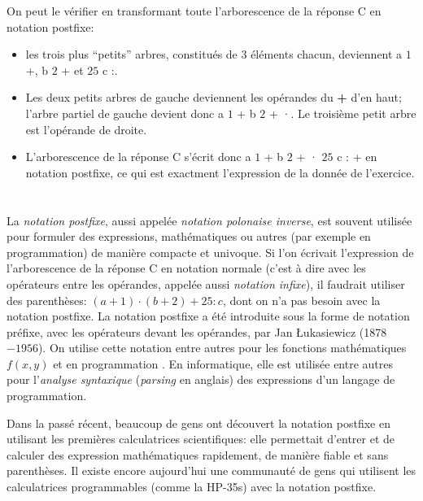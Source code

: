 {{On peut le vérifier en transformant toute l’arborescence de la réponse C en notation postfixe:

\begin{itemize}
  \item les trois plus “petits” arbres, constitués de $3$ éléments chacun, deviennent a $1$ +, b $2$ + et $25$ c :.
  \item Les deux petits arbres de gauche deviennent les opérandes du \textbf{+} d’en haut; l’arbre partiel de gauche devient donc a $1$ + b $2$ + ·. Le troisième petit arbre est l’opérande de droite.
  \item L’arborescence de la réponse C s’écrit donc a $1$ + b $2$ + · $25$ c : + en notation postfixe, ce qui est exactment l’expression de la donnée de l’exercice.
\end{itemize}



\section*{\BrochureItsInformatics}
La \emph{notation postfixe}, aussi appelée \emph{notation polonaise inverse}, est souvent utilisée pour formuler des expressions, mathématiques ou autres (par exemple en programmation) de manière compacte et univoque. Si l’on écrivait l’expression de l’arborescence de la réponse C en notation normale (c’est à dire avec les opérateurs entre les opérandes, appelée aussi \emph{notation infixe}), il faudrait utiliser des parenthèses: ${(a + 1) \cdot (b + 2) + 25 : c}$, dont on n’a pas besoin avec la notation postfixe. La notation postfixe a été introduite sous la forme de notation préfixe, avec les opérateurs devant les opérandes, par Jan Łukasiewicz (1878$-1956$). On utilise cette notation entre autres pour les fonctions mathématiques ${f(x, y)}$ et en programmation . En informatique, elle est utilisée entre autres pour l’\emph{analyse syntaxique} (\emph{parsing} en anglais) des expressions d’un langage de programmation.

Dans la passé récent, beaucoup de gens ont découvert la notation postfixe en utilisant les premières calculatrices scientifiques: elle permettait d’entrer et de calculer des expression mathématiques rapidement, de manière fiable et sans parenthèses. Il existe encore aujourd’hui une communauté de gens qui utilisent les calculatrices programmables (comme la HP-35s) avec la notation postfixe.



}}
